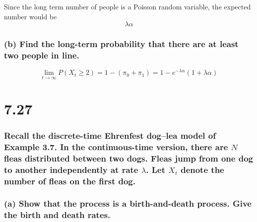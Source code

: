 \documentclass[]{article}
\begin{document}
Since the long term number of people is a Poisson random variable, the
expected number would be\\
\[\lambda \alpha\]

\hypertarget{b-find-the-long-term-probability-that-there-are-at-least-two-people-in-line.}{%
\subsubsection{(b) Find the long-term probability that there are at
least two people in
line.}\label{b-find-the-long-term-probability-that-there-are-at-least-two-people-in-line.}}

\[
\lim_{t \rightarrow \infty } P(X_t \geq 2) = 1- (\pi_0 + \pi_1) = 1 - e^{-\lambda \alpha}(1+ \lambda \alpha)
\]

\hypertarget{section-2}{%
\section{7.27}\label{section-2}}

\hypertarget{recall-the-discrete-time-ehrenfest-doglea-model-of-example-3.7.-in-the-continuous-time-version-there-are-n-fleas-distributed-between-two-dogs.-fleas-jump-from-one-dog-to-another-independently-at-rate-lambda.-let-x_t-denote-the-number-of-fleas-on-the-first-dog.}{%
\subsubsection{\texorpdfstring{Recall the discrete-time Ehrenfest
dog--lea model of Example 3.7. In the continuous-time version, there are
\(N\) fleas distributed between two dogs. Fleas jump from one dog to
another independently at rate \(\lambda\). Let \(X_t\) denote the number
of fleas on the first
dog.}{Recall the discrete-time Ehrenfest dog--lea model of Example 3.7. In the continuous-time version, there are N fleas distributed between two dogs. Fleas jump from one dog to another independently at rate \textbackslash{}lambda. Let X\_t denote the number of fleas on the first dog.}}\label{recall-the-discrete-time-ehrenfest-doglea-model-of-example-3.7.-in-the-continuous-time-version-there-are-n-fleas-distributed-between-two-dogs.-fleas-jump-from-one-dog-to-another-independently-at-rate-lambda.-let-x_t-denote-the-number-of-fleas-on-the-first-dog.}}

\hypertarget{a-show-that-the-process-is-a-birth-and-death-process.-give-the-birth-and-death-rates.}{%
\subsubsection{(a) Show that the process is a birth-and-death process.
Give the birth and death
rates.}\label{a-show-that-the-process-is-a-birth-and-death-process.-give-the-birth-and-death-rates.}}
\end{document}
